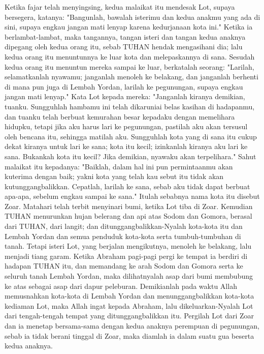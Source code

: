 \begin{biblechapter}
\verse Ketika fajar telah menyingsing, kedua malaikat itu mendesak Lot, supaya bersegera, katanya: "Bangunlah, bawalah isterimu dan kedua anakmu yang ada di sini, supaya engkau jangan mati lenyap karena kedurjanaan kota ini."
\verse Ketika ia berlambat-lambat, maka tangannya, tangan isteri dan tangan kedua anaknya dipegang oleh kedua orang itu, sebab TUHAN hendak mengasihani dia; lalu kedua orang itu menuntunnya ke luar kota dan melepaskannya di sana.
\verse Sesudah kedua orang itu menuntun mereka sampai ke luar, berkatalah seorang: "Larilah, selamatkanlah nyawamu; janganlah menoleh ke belakang, dan janganlah berhenti di mana pun juga di Lembah Yordan, larilah ke pegunungan, supaya engkau jangan mati lenyap."
\verse Kata Lot kepada mereka: "Janganlah kiranya demikian, tuanku.
\verse Sungguhlah hambamu ini telah dikaruniai belas kasihan di hadapanmu, dan tuanku telah berbuat kemurahan besar kepadaku dengan memelihara hidupku, tetapi jika aku harus lari ke pegunungan, pastilah aku akan tersusul oleh bencana itu, sehingga matilah aku.
\verse Sungguhlah kota yang di sana itu cukup dekat kiranya untuk lari ke sana; kota itu kecil; izinkanlah kiranya aku lari ke sana. Bukankah kota itu kecil? Jika demikian, nyawaku akan terpelihara."
\verse Sahut malaikat itu kepadanya: "Baiklah, dalam hal ini pun permintaanmu akan kuterima dengan baik; yakni kota yang telah kau sebut itu tidak akan kutunggangbalikkan.
\verse Cepatlah, larilah ke sana, sebab aku tidak dapat berbuat apa-apa, sebelum engkau sampai ke sana." Itulah sebabnya nama kota itu disebut Zoar.
\verse Matahari telah terbit menyinari bumi, ketika Lot tiba di Zoar.
\verse Kemudian TUHAN menurunkan hujan belerang dan api atas Sodom dan Gomora, berasal dari TUHAN, dari langit;
\verse dan ditunggangbalikkan-Nyalah kota-kota itu dan Lembah Yordan dan semua penduduk kota-kota serta tumbuh-tumbuhan di tanah.
\verse Tetapi isteri Lot, yang berjalan mengikutnya, menoleh ke belakang, lalu menjadi tiang garam.
\verse Ketika Abraham pagi-pagi pergi ke tempat ia berdiri di hadapan TUHAN itu,
\verse dan memandang ke arah Sodom dan Gomora serta ke seluruh tanah Lembah Yordan, maka dilihatnyalah asap dari bumi membubung ke atas sebagai asap dari dapur peleburan.
\verse Demikianlah pada waktu Allah memusnahkan kota-kota di Lembah Yordan dan menunggangbalikkan kota-kota kediaman Lot, maka Allah ingat kepada Abraham, lalu dikeluarkan-Nyalah Lot dari tengah-tengah tempat yang ditunggangbalikkan itu.
 Pergilah Lot dari Zoar dan ia menetap bersama-sama dengan kedua anaknya perempuan di pegunungan, sebab ia tidak berani tinggal di Zoar, maka diamlah ia dalam suatu gua beserta kedua anaknya.

\end{biblechapter}

